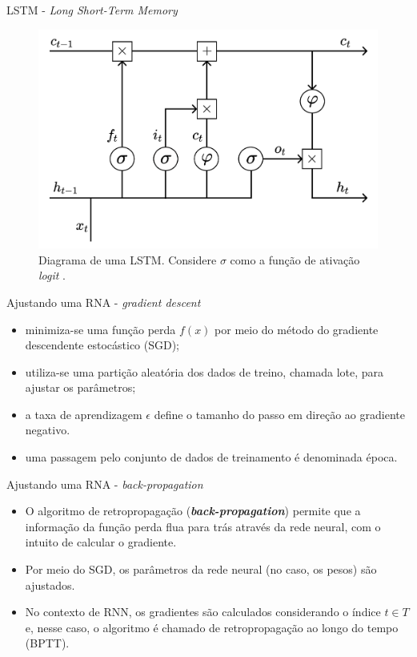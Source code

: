 \documentclass{beamer}
\begin{document}
    \begin{frame}{LSTM - \textit{Long Short-Term Memory}}
       \begin{figure}
            \centering
            \includegraphics[scale=0.25]{figuras/lstm_cell.pdf}
	        \caption{Diagrama de uma LSTM. Considere $\sigma$ como a função de ativação \textit{logit} \citep[adaptado de][]{kamath2019}.}
        \end{figure}
    \end{frame}

    \begin{frame}{Ajustando uma RNA - \textit{gradient descent}}
        \begin{itemize}
            \justifying
            \item minimiza-se uma função perda $f(x)$ por meio do método do gradiente descendente estocástico (SGD);
            \item utiliza-se uma partição aleatória dos dados de treino, chamada lote, para ajustar os parâmetros;
            \item a taxa de aprendizagem $\epsilon$ define o tamanho do passo em direção ao gradiente negativo.
            \item uma passagem pelo conjunto de dados de treinamento é denominada época.
        \end{itemize}
    \end{frame}

    \begin{frame}{Ajustando uma RNA - \textit{back-propagation}}
        \begin{itemize}
            \item O algoritmo de retropropagação (\textbf{\textit{back-propagation}}) permite que a informação da função perda flua para trás através da rede neural, com o intuito de calcular o gradiente.
            \item Por meio do SGD, os parâmetros da rede neural (no caso, os pesos) são ajustados.
            \item No contexto de RNN, os gradientes são calculados considerando o índice $t \in T$ e, nesse caso, o algoritmo é chamado de retropropagação ao longo do tempo (BPTT).
            
        \end{itemize}
    \end{frame}
\end{document}
